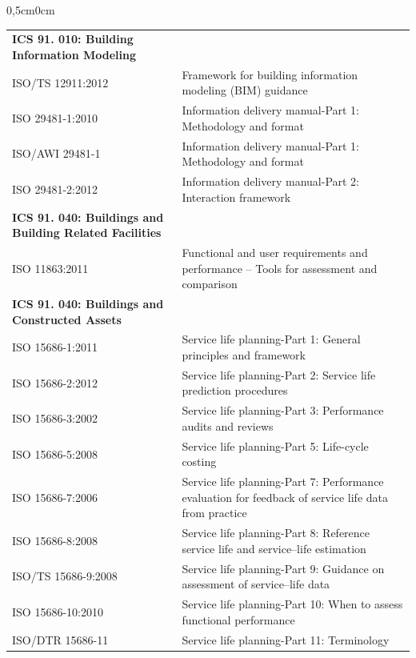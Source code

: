 \begin{landscape}
\begin{table}[h!]
\begin{adjustwidth}{0,5cm}{0cm}
{\begin{tabular}{ll}
				{\bf ICS 91. 010: Building Information Modeling} & \\
				ISO/TS 12911:2012 & Framework for building information modeling (BIM) guidance \\ 		        
				ISO 29481-1:2010 & Information delivery manual-Part 1: Methodology and format \\	            
				ISO/AWI 29481-1 & Information delivery manual-Part 1: Methodology and format \\	            
				ISO 29481-2:2012 & Information delivery manual-Part 2: Interaction framework \\
				\hline

				{\bf ICS 91. 040: Buildings and Building Related Facilities}  & \\  
				ISO 11863:2011 & Functional and user requirements and performance -- Tools for assessment and comparison \\
				\hline

				{\bf ICS 91. 040: Buildings and Constructed Assets}  & \\
				ISO 15686-1:2011 & Service life planning-Part 1: General principles and framework \\
				ISO 15686-2:2012 & Service life planning-Part 2: Service life prediction procedures \\		            
				ISO 15686-3:2002 & Service life planning-Part 3: Performance audits and reviews  \\		            
				ISO 15686-5:2008 & Service life planning-Part 5: Life-cycle costing  \\	            
				ISO 15686-7:2006 & Service life planning-Part 7: Performance evaluation for feedback of service life data from practice  \\	            
				ISO 15686-8:2008 & Service life planning-Part 8: Reference service life and service--life estimation \\		            
				ISO/TS 15686-9:2008 & Service life planning-Part 9: Guidance on assessment of service--life data  \\		            
				ISO 15686-10:2010 & Service life planning-Part 10: When to assess functional performance \\		            
				ISO/DTR 15686-11 & Service life planning-Part 11: Terminology \\
				\hline


\end{tabular}}
\end{adjustwidth}
\end{table}
\end{landscape}

